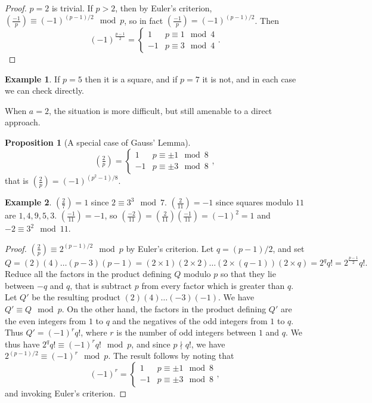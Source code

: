 \documentclass{article}
\newcommand{\rb}[1]{\left( #1 \right)}
\newcommand{\legendre}[2]{\rb{\tfrac{#1}{#2}}}
\theoremstyle{definition}\newtheorem{definition}{Definition}
\theoremstyle{definition}\newtheorem{remark}[definition]{Remark}
\theoremstyle{definition}\newtheorem*{example}{Example}
\theoremstyle{definition}\newtheorem*{note}{Note}
\newtheorem{proposition}[definition]{Proposition}
\begin{document}
\begin{proof}
$ p = 2 $ is trivial. If $ p > 2 $, then by Euler's criterion, $ \legendre{-1}{p} \equiv \rb{-1}^{\rb{p - 1} / 2} \mod p $, so in fact $ \legendre{-1}{p} = \rb{-1}^{\rb{p - 1} / 2} $. Then
$$ \rb{-1}^{\tfrac{p - 1}{2}} = \begin{cases} 1 & p \equiv 1 \mod 4 \\ -1 & p \equiv 3 \mod 4 \end{cases}. $$
\end{proof}

\begin{example}
If $ p = 5 $ then it is a square, and if $ p = 7 $ it is not, and in each case we can check directly.
\end{example}

When $ a = 2 $, the situation is more difficult, but still amenable to a direct approach.

\begin{proposition}[A special case of Gauss' Lemma]
$$ \legendre{2}{p} = \begin{cases} 1 & p \equiv \pm 1 \mod 8 \\ -1 & p \equiv \pm 3 \mod 8 \end{cases}, $$
that is $ \legendre{2}{p} = \rb{-1}^{\rb{p^2 - 1} / 8} $.
\end{proposition}

\begin{example}
$ \legendre{2}{7} = 1 $ since $ 2 \equiv 3^3 \mod 7 $. $ \legendre{2}{11} = -1 $ since squares modulo $ 11 $ are $ 1, 4, 9, 5, 3 $. $ \legendre{-1}{11} = -1 $, so $ \legendre{-2}{11} = \legendre{2}{11}\legendre{-1}{11} = \rb{-1}^2 = 1 $ and $ -2 \equiv 3^2 \mod 11 $.
\end{example}

\begin{proof}
$ \legendre{2}{p} \equiv 2^{\rb{p - 1} / 2} \mod p $ by Euler's criterion. Let $ q = \rb{p - 1} / 2 $, and set
$$ Q = \rb{2}\rb{4} \dots \rb{p - 3}\rb{p - 1} = \rb{2 \times 1}\rb{2 \times 2} \dots \rb{2 \times \rb{q - 1}}\rb{2 \times q} = 2^qq! = 2^{\tfrac{p - 1}{2}}q!. $$
Reduce all the factors in the product defining $ Q $ modulo $ p $ so that they lie between $ -q $ and $ q $, that is subtract $ p $ from every factor which is greater than $ q $. Let $ Q' $ be the resulting product $ \rb{2}\rb{4} \dots \rb{-3}\rb{-1} $. We have $ Q' \equiv Q \mod p $. On the other hand, the factors in the product defining $ Q' $ are the even integers from $ 1 $ to $ q $ and the negatives of the odd integers from $ 1 $ to $ q $. Thus $ Q' = \rb{-1}^rq! $, where $ r $ is the number of odd integers between $ 1 $ and $ q $. We thus have $ 2^qq! \equiv \rb{-1}^rq! \mod p $, and since $ p \nmid q! $, we have $ 2^{\rb{p - 1} / 2} \equiv \rb{-1}^r \mod p $. The result follows by noting that
$$ \rb{-1}^r = \begin{cases} 1 & p \equiv \pm 1 \mod 8 \\ -1 & p \equiv \pm 3 \mod 8 \end{cases}, $$
and invoking Euler's criterion.
\end{proof}
\end{document}
